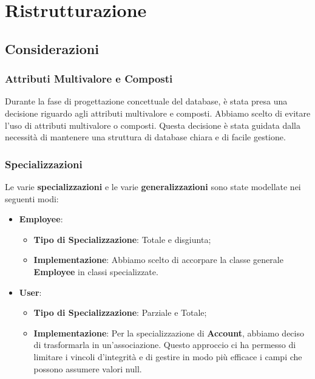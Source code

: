 \section{Ristrutturazione}

\subsection{Considerazioni}

\subsubsection{Attributi Multivalore e Composti}

Durante la fase di progettazione concettuale del database, è stata presa una decisione riguardo agli attributi multivalore e composti. Abbiamo scelto di evitare l'uso di attributi multivalore o composti. Questa decisione è stata guidata dalla necessità di mantenere una struttura di database chiara e di facile gestione.

\subsubsection{Specializzazioni}

Le varie \textbf{specializzazioni} e le varie \textbf{generalizzazioni} sono state modellate nei seguenti modi:

\begin{itemize}[leftmargin=*,label={\textbullet},itemsep=0pt,topsep=0pt,partopsep=0pt]
    \item \textbf{Employee}:
          \begin{itemize}[leftmargin=*,label={\textbullet},itemsep=0pt,topsep=0pt,partopsep=0pt]
            \item \textbf{Tipo di Specializzazione}: Totale e disgiunta;
            \item \textbf{Implementazione}: Abbiamo scelto di accorpare la classe generale \textbf{Employee} in classi specializzate.
          \end{itemize}
    \item \textbf{User}:
          \begin{itemize}[leftmargin=*,label={\textbullet},itemsep=0pt,topsep=0pt,partopsep=0pt]
            \item \textbf{Tipo di Specializzazione}: Parziale e Totale;
            \item \textbf{Implementazione}: Per la specializzazione di \textbf{Account}, abbiamo deciso di trasformarla in un'associazione. Questo approccio ci ha permesso di limitare i vincoli d'integrità e di gestire in modo più efficace i campi che possono assumere valori null.
          \end{itemize}
\end{itemize}

